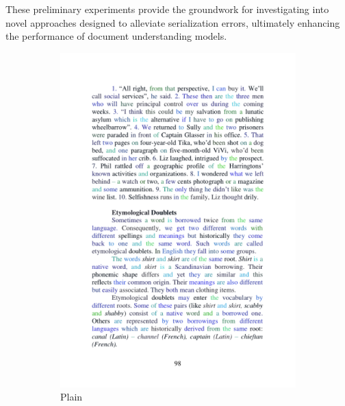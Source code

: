 These preliminary experiments provide the groundwork for investigating into novel approaches designed to alleviate serialization errors, ultimately enhancing the performance of document understanding models.

\begin{figure}
    \centering
    \small
      \begin{subfigure}[b]{0.24\textwidth}
        \includegraphics[width=\textwidth]{images/chapter4/plain.pdf}
        \caption{Plain}
      \end{subfigure}
      \begin{subfigure}[b]{0.24\textwidth}

\end{subfigure}
\end{figure}

